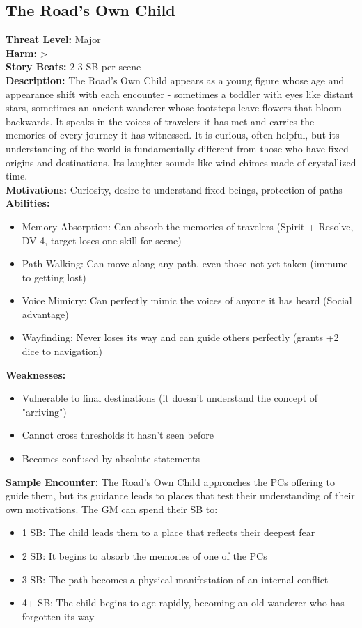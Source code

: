 \documentclass[11pt]{article}
\newenvironment{monsterentry}[1]{%
  \begin{mdframed}[backgroundcolor=shadecolor, linewidth=0pt, leftmargin=0pt, rightmargin=0pt]%
  \subsection*{#1}%
}{%
  \end{mdframed}%
}
\begin{document}
\begin{monsterentry}{The Road's Own Child}
\textbf{Threat Level:} Major \\
\textbf{Harm:} \textgreater \\
\textbf{Story Beats:} 2-3 SB per scene \\
\textbf{Description:} The Road's Own Child appears as a young figure whose age and appearance shift with each encounter - sometimes a toddler with eyes like distant stars, sometimes an ancient wanderer whose footsteps leave flowers that bloom backwards. It speaks in the voices of travelers it has met and carries the memories of every journey it has witnessed. It is curious, often helpful, but its understanding of the world is fundamentally different from those who have fixed origins and destinations. Its laughter sounds like wind chimes made of crystallized time. \\
\textbf{Motivations:} Curiosity, desire to understand fixed beings, protection of paths \\
\textbf{Abilities:}
\begin{itemize}
    \item Memory Absorption: Can absorb the memories of travelers (Spirit + Resolve, DV 4, target loses one skill for scene)
    \item Path Walking: Can move along any path, even those not yet taken (immune to getting lost)
    \item Voice Mimicry: Can perfectly mimic the voices of anyone it has heard (Social advantage)
    \item Wayfinding: Never loses its way and can guide others perfectly (grants +2 dice to navigation)
\end{itemize}
\textbf{Weaknesses:}
\begin{itemize}
    \item Vulnerable to final destinations (it doesn't understand the concept of "arriving")
    \item Cannot cross thresholds it hasn't seen before
    \item Becomes confused by absolute statements
\end{itemize}
\textbf{Sample Encounter:} The Road's Own Child approaches the PCs offering to guide them, but its guidance leads to places that test their understanding of their own motivations. The GM can spend their SB to:
\begin{itemize}
    \item 1 SB: The child leads them to a place that reflects their deepest fear
    \item 2 SB: It begins to absorb the memories of one of the PCs
    \item 3 SB: The path becomes a physical manifestation of an internal conflict
    \item 4+ SB: The child begins to age rapidly, becoming an old wanderer who has forgotten its way
\end{itemize}
\end{monsterentry}
\end{document}
